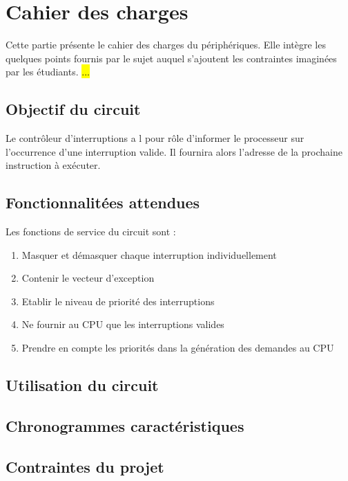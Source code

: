 \section{Cahier des charges}
Cette partie présente le cahier des charges du périphériques.
Elle intègre les quelques points fournis par le sujet auquel s'ajoutent les contraintes imaginées par les étudiants.
\hl{...}
\subsection{Objectif du circuit}
Le contrôleur d'interruptions a l pour rôle d'informer le processeur sur l’occurrence d'une interruption valide.
Il fournira alors l’adresse de la prochaine instruction à exécuter.

\subsection{Fonctionnalitées attendues}
Les fonctions de service du circuit sont :
\begin{enumerate}
    \item Masquer et démasquer chaque interruption individuellement
    \item Contenir le vecteur d'exception
    \item Etablir le niveau de priorité des interruptions
    \item Ne fournir au \gls{CPU} que les interruptions valides
    \item Prendre en compte les priorités dans la génération des demandes au \gls{CPU}
\end{enumerate}
\subsection{Utilisation du circuit}

\subsection{Chronogrammes caractéristiques}

\subsection{Contraintes du projet}

